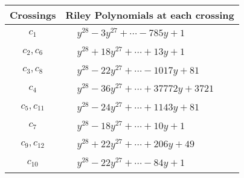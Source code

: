 \documentclass[1p]{elsarticle_modified}
\theoremstyle{definition}
\begin{document}
\begin{tabular}{m{50pt}|m{274pt}}
Crossings & \hspace{64pt}Riley Polynomials at each crossing \\
\hline $$\begin{aligned}c_{1}\end{aligned}$$&$\begin{aligned}
&y^{28}-3 y^{27}+\cdots-785 y+1
\end{aligned}$\\
\hline $$\begin{aligned}c_{2},c_{6}\end{aligned}$$&$\begin{aligned}
&y^{28}+18 y^{27}+\cdots+13 y+1
\end{aligned}$\\
\hline $$\begin{aligned}c_{3},c_{8}\end{aligned}$$&$\begin{aligned}
&y^{28}-22 y^{27}+\cdots-1017 y+81
\end{aligned}$\\
\hline $$\begin{aligned}c_{4}\end{aligned}$$&$\begin{aligned}
&y^{28}-36 y^{27}+\cdots+37772 y+3721
\end{aligned}$\\
\hline $$\begin{aligned}c_{5},c_{11}\end{aligned}$$&$\begin{aligned}
&y^{28}-24 y^{27}+\cdots+1143 y+81
\end{aligned}$\\
\hline $$\begin{aligned}c_{7}\end{aligned}$$&$\begin{aligned}
&y^{28}-18 y^{27}+\cdots+10 y+1
\end{aligned}$\\
\hline $$\begin{aligned}c_{9},c_{12}\end{aligned}$$&$\begin{aligned}
&y^{28}+22 y^{27}+\cdots+206 y+49
\end{aligned}$\\
\hline $$\begin{aligned}c_{10}\end{aligned}$$&$\begin{aligned}
&y^{28}-22 y^{27}+\cdots-84 y+1
\end{aligned}$\\
\hline
\end{tabular}\\~\\
\end{document}

